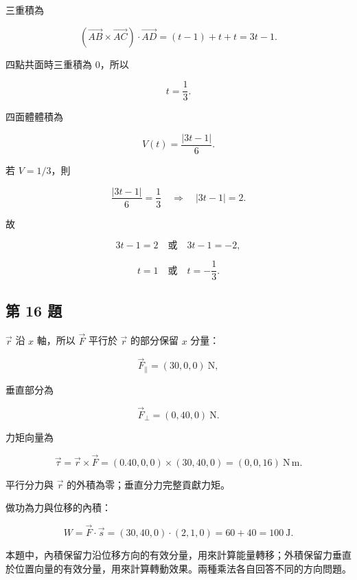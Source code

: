\documentclass[11pt,a4paper]{article}
\begin{document}
三重積為

\[
(\overrightarrow{AB}\times\overrightarrow{AC})
\cdot\overrightarrow{AD}
=(t-1)+t+t=3t-1.
\]

四點共面時三重積為 \(0\)，所以

\[
\boxed{t=\frac13}.
\]

四面體體積為

\[
\boxed{V(t)=\frac{|3t-1|}{6}}.
\]

若 \(V=1/3\)，則

\[
\frac{|3t-1|}{6}=\frac13
\quad\Longrightarrow\quad
|3t-1|=2.
\]

故

\[
3t-1=2\quad\text{或}\quad3t-1=-2,
\]

\[
\boxed{t=1\quad\text{或}\quad t=-\frac13}.
\]

\subsection{第 16 題}\label{ux7b2c-16-ux984c}

\(\vec r\) 沿 \(x\) 軸，所以 \(\vec F\) 平行於 \(\vec r\) 的部分保留 \(x\) 分量：

\[
\vec F_\parallel=(30,0,0)\ \mathrm N,
\]

垂直部分為

\[
\vec F_\perp=(0,40,0)\ \mathrm N.
\]

力矩向量為

\[
\vec\tau
=\vec r\times\vec F
=(0.40,0,0)\times(30,40,0)
=\boxed{(0,0,16)\ \mathrm{N\,m}}.
\]

平行分力與 \(\vec r\) 的外積為零；垂直分力完整貢獻力矩。

做功為力與位移的內積：

\[
W=\vec F\cdot\vec s
=(30,40,0)\cdot(2,1,0)
=60+40
=\boxed{100\ \mathrm J}.
\]

本題中，內積保留力沿位移方向的有效分量，用來計算能量轉移；外積保留力垂直於位置向量的有效分量，用來計算轉動效果。兩種乘法各自回答不同的方向問題。
\end{document}
